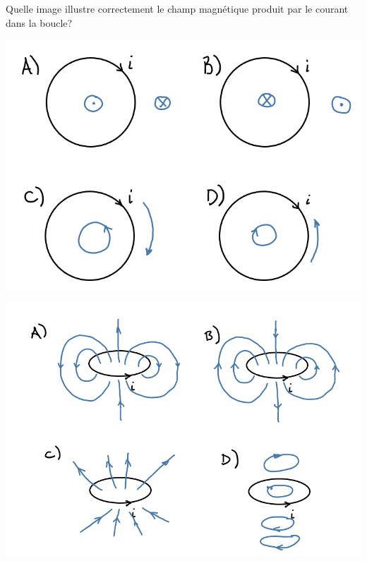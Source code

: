 \begin{diapobox}
  Quelle image illustre correctement le champ magnétique produit par le courant
  dans la boucle?

  \begin{center}
    \includegraphics[scale=0.3]{08-champ-magnetique/figures/champ_boucle_ex1.png}
  \end{center}

  \begin{center}
    \includegraphics[scale=0.3]{08-champ-magnetique/figures/champ_boucle_ex2.png}
  \end{center}
\end{diapobox}

